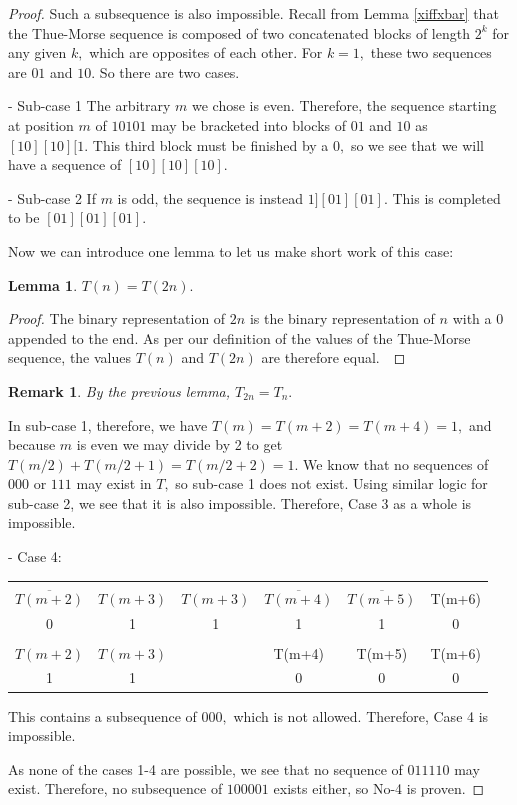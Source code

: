 \documentclass{article}
\newtheorem{lemma}{Lemma}[section]
\newtheorem{remark}{Remark}[section]
\begin{document}
\begin{proof}
Such a subsequence is also impossible. Recall from Lemma \ref{xiffxbar} that the Thue-Morse sequence is composed of two concatenated blocks of length $2^k$ for any given $k,$ which are opposites of each other. For $k = 1,$ these two sequences are $01$ and $10.$ So there are two cases.

- Sub-case 1
The arbitrary $m$ we chose is even. Therefore, the sequence starting at position $m$ of $10101$ may be bracketed into blocks of $01$ and $10$ as $[10][10][1.$ This third block must be finished by a $0,$ so we see that we will have a sequence of $[10][10][10].$

- Sub-case 2
If $m$ is odd, the sequence is instead $1][01][01].$ This is completed to be $[01][01][01].$

Now we can introduce one lemma to let us make short work of this case:

\begin{lemma}
$T(n) = T(2n).$
\end{lemma}

\begin{proof}
The binary representation of $2n$ is the binary representation of $n$ with a $0$ appended to the end. As per our definition of the values of the Thue-Morse sequence, the values $T(n)$ and $T(2n)$ are therefore equal.\
\end{proof}

\begin{remark}
By the previous lemma, $T_{2n} = T_n.$
\end{remark}

In sub-case 1, therefore, we have $T(m) = T(m+2) = T(m+4) = 1,$ and because $m$ is even we may divide by 2 to get $T(m/2) + T(m/2 + 1) = T(m/2 + 2) = 1.$ We know that no sequences of $000$ or $111$ may exist in $T,$ so sub-case 1 does not exist. Using similar logic for sub-case 2, we see that it is also impossible. Therefore, Case 3 as a whole is impossible.

- Case 4:

\begin{center}
\begin{tabular}{ |c|c|c|c|c|c| } 
 \hline
 &&&&&\\
$\overline{T(m+2)}$ & $T(m+3)$ & $T(m+3)$ & $\overline{T(m+4)}$ & $\overline{T(m+5)}$ & T(m+6) \\ 
0 & 1 & 1 & 1 & 1 & 0 \\
\hline
&&&&&\\
$T(m+2)$ & $T(m+3)$ & & T(m+4) & T(m+5) & T(m+6) \\
1 & 1 & & 0 & 0 & 0 \\
 \hline
\end{tabular}
\end{center}

This contains a subsequence of $000,$ which is not allowed. Therefore, Case 4 is impossible.

As none of the cases 1-4 are possible, we see that no sequence of $011110$ may exist. Therefore, no subsequence of $100001$ exists either, so No-4 is proven.
\end{proof}
\end{document}
